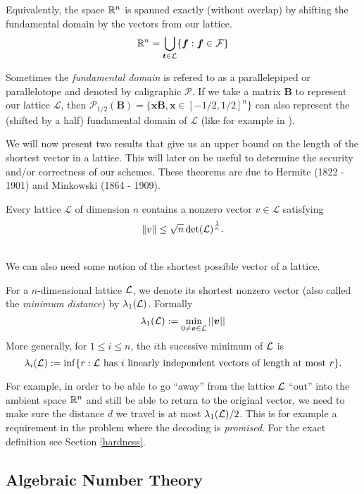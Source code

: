 Equivalently, the space $\mathbb{R}^n$ is spanned exactly (without overlap) by shifting the fundamental domain by the vectors from our lattice.
$$ \mathbb{R}^n = \bigcup_{\boldsymbol{t} \in \mathcal{L}} \{\boldsymbol{f} : \boldsymbol{f} \in \mathcal{F} \}$$

\begin{remark}
    Sometimes the \textit{fundamental domain} is refered to as a parallelepiped or parallelotope and denoted by caligraphic $\mathcal{P}$. If we take a matrix $\bm{B}$ to represent our lattice $\mathcal{L}$, then $\mathcal{P}_{1/2}(\bm{B}) = \{\bm{x}\bm{B}, \bm{x} \in [-1/2, 1/2]^n \}$ can also represent the (shifted by a half) fundamental domain of $\mathcal{L}$ (like for example in \cite{gentry}).
\end{remark}

We will now present two results that give us an upper bound on the length of the shortest vector in a lattice. This will later on be useful to determine the security and/or correctness of our schemes. These theorems are due to Hermite (1822 - 1901) and Minkowski (1864 - 1909).

\begin{theorem}
    Every lattice $\mathcal{L}$ of dimension $n$ contains a nonzero vector $v \in \mathcal{L}$ satisfying
    $$ \norm{v} \leq \sqrt{n} \det(\mathcal{L})^{\frac{1}{n}}.$$
\end{theorem}
\\
We can also need some notion of the shortest possible vector of a lattice. 
\begin{definition}
	For a $n$-dimensional lattice $\mathcal{L}$, we denote its shortest nonzero vector (also called the \textit{minimum distance}) by $\lambda_1(\mathcal{L})$. Formally
	\[ \lambda_1(\mathcal{L}) := \min_{0 \neq \boldsymbol{v} \in \mathcal{L}} ||\boldsymbol{v}|| \]
	More generally, for $1 \leq i \leq n$, the $i$th sucessive minimum of $\mathcal{L}$ is
	\[\lambda_i(\mathcal{L}) := \inf \{r : \mathcal{L} \text{ has $i$ linearly independent vectors of length at most } r \}. \]
\end{definition}
For example, in order to be able to go ``away'' from the lattice $\mathcal{L}$ ``out'' into the ambient space $\mathbb{R}^n$ and still be able to return to the original vector, we need to make sure the distance $d$ we travel is at most $\lambda_1(\mathcal{L})/2$. This is for example a requirement in the  problem where the decoding is \textit{promised}. For the exact definition see Section \ref{hardness}.
\subsection{Algebraic Number Theory}

